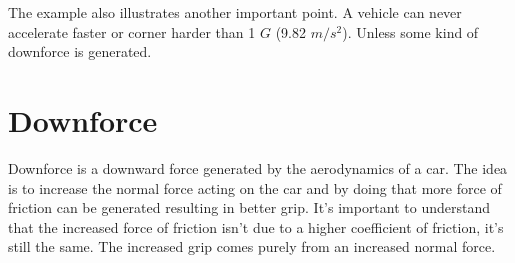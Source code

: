 The example also illustrates another important point. A vehicle can never accelerate faster or corner harder than 1 $ G $ (9.82 $ m/s^2 $). Unless some kind of downforce is generated. 

\section{Downforce}
Downforce is a downward force generated by the aerodynamics of a car. The idea is to increase the normal force acting on the car and by doing that more force of friction can be generated resulting in better grip. It's important to understand that the increased force of friction isn't due to a higher coefficient of friction, it's still the same. The increased grip comes purely from an increased normal force.